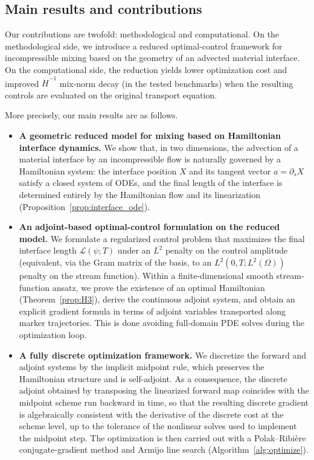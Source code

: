 \documentclass[12pt, reqno]{amsart}
\theoremstyle{plain}
\theoremstyle{definition}
\numberwithin{equation}{section}
\numberwithin{figure}{section}
\numberwithin{algorithm}{section}
\begin{document}
\subsection{Main results and contributions}\label{sec:main_results}

Our contributions are twofold: methodological and computational. On the methodological side, we introduce a reduced optimal-control framework for incompressible mixing based on the geometry of an advected material interface. On the computational side, the reduction yields lower optimization cost and improved $\dot{H}^{-1}$ mix-norm decay (in the tested benchmarks) when the resulting controls are evaluated on the original transport equation.

More precisely, our main results are as follows.

\begin{itemize}
\item \textbf{A geometric reduced model for mixing based on Hamiltonian interface dynamics.}
We show that, in two dimensions, the advection of a material interface by an incompressible flow is naturally governed by a Hamiltonian system: the interface position $X$ and its tangent vector $a=\partial_s X$ satisfy a closed system of ODEs, and the final length of the interface is determined entirely by the Hamiltonian flow and its linearization (Proposition~\ref{prop:interface_ode}). 

\item \textbf{An adjoint-based optimal-control formulation on the reduced model.}
We formulate a regularized control problem that maximizes the final interface length $\mathcal L(\psi;T)$ under an $L^2$ penalty on the control amplitude (equivalent, via the Gram matrix of the basis, to an $L^2(0,T;L^2(\Omega))$ penalty on the stream function). Within a finite-dimensional smooth stream-function ansatz, we prove the existence of an optimal Hamiltonian (Theorem~\ref{prop:H3}), derive the continuous adjoint system, and obtain an explicit gradient formula in terms of adjoint variables transported along marker trajectories. This is done avoiding full-domain PDE solves during the optimization loop.

\item \textbf{A fully discrete optimization framework.}
We discretize the forward and adjoint systems by the implicit midpoint rule, which preserves the Hamiltonian structure and is self-adjoint. As a consequence, the discrete adjoint obtained by transposing the linearized forward map coincides with the midpoint scheme run backward in time, so that the resulting discrete gradient is algebraically consistent with the derivative of the discrete cost at the scheme level, up to the tolerance of the nonlinear solves used to implement the midpoint step. The optimization is then carried out with a Polak--Ribi\`ere conjugate-gradient method and Armijo line search (Algorithm~\ref{alg:optimize}).


\end{itemize}
\end{document}
